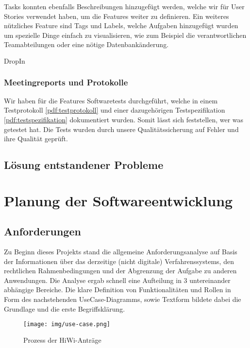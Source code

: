 \documentclass[12pt,a4paper]{scrartcl}
\begin{document}
Tasks konnten ebenfalls Beschreibungen hinzugefügt werden, welche wir für User Stories verwendet haben, um die Features weiter zu definieren.
Ein weiteres nützliches Feature sind Tags und Labels, welche Aufgaben hinzugefügt wurden um spezielle Dinge einfach zu visualisieren, wie zum Beispiel die verantwortlichen Teamabteilungen oder eine nötige Datenbankänderung.

DropIn


\subsubsection{Meetingreports und Protokolle}
\label{reports}
Wir haben für die Features Softwaretests durchgeführt, welche in einem Testprotokoll \ref{pdf:testprotokoll} und einer dazugehörigen Testspezifikation \ref{pdf:testspezifikation} dokumentiert wurden.
Somit lässt sich feststellen, wer was getestet hat.
Die Tests wurden durch unsere Qualitätssicherung auf Fehler und ihre Qualität geprüft.

\subsection{Lösung entstandener Probleme}

\section{Planung der Softwareentwicklung}

\subsection{Anforderungen}
\label{requirements}

Zu Beginn dieses Projekts stand die allgemeine Anforderungsanalyse auf Basis der Informationen über das derzeitige (nicht digitale) Verfahrenssystems, den rechtlichen Rahmenbedingungen und der 
 Abgrenzung der Aufgabe zu anderen Anwendungen. Die Analyse ergab schnell eine Aufteilung in 3 untereinander abhängige Bereiche. Die klare Definition von Funktionalitäten und Rollen in Form des nachstehenden UseCase-Diagramms, sowie Textform bildete dabei die Grundlage und die erste Begriffsklärung.

\begin{figure}[H]
	\centering
	\texttt{[image: img/use-case.png]}
	\caption{Prozess der HiWi-Anträge}
	\label{fig:use-case}
\end{figure}
\end{document}
